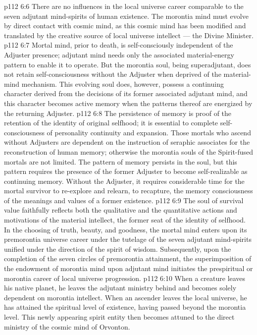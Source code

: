 \vs p112 6:6 There are no influences in the local universe career comparable to the seven adjutant mind\hyp{}spirits of human existence. The morontia mind must evolve by direct contact with cosmic mind, as this cosmic mind has been modified and translated by the creative source of local universe intellect --- the Divine Minister.
\vs p112 6:7 \pc Mortal mind, prior to death, is self\hyp{}consciously independent of the Adjuster presence; adjutant mind needs only the associated material\hyp{}energy pattern to enable it to operate. But the morontia soul, being superadjutant, does not retain self\hyp{}consciousness without the Adjuster when deprived of the material\hyp{}mind mechanism. This evolving soul does, however, possess a continuing character derived from the decisions of its former associated adjutant mind, and this character becomes active memory when the patterns thereof are energized by the returning Adjuster.
\vs p112 6:8 The persistence of memory is proof of the retention of the identity of original selfhood; it is essential to complete self\hyp{}consciousness of personality continuity and expansion. Those mortals who ascend without Adjusters are dependent on the instruction of seraphic associates for the reconstruction of human memory; otherwise the morontia souls of the Spirit\hyp{}fused mortals are not limited. The pattern of memory persists in the soul, but this pattern requires the presence of the former Adjuster to become  self\hyp{}realizable as continuing memory. Without the Adjuster, it requires considerable time for the mortal survivor to re\hyp{}explore and relearn, to recapture, the memory consciousness of the meanings and values of a former existence.
\vs p112 6:9 The soul of survival value faithfully reflects both the qualitative and the quantitative actions and motivations of the material intellect, the former seat of the identity of selfhood. In the choosing of truth, beauty, and goodness, the mortal mind enters upon its premorontia universe career under the tutelage of the seven adjutant mind\hyp{}spirits unified under the direction of the spirit of wisdom. Subsequently, upon the completion of the seven circles of premorontia attainment, the superimposition of the endowment of morontia mind upon adjutant mind initiates the prespiritual or morontia career of local universe progression.
\vs p112 6:10 \pc When a creature leaves his native planet, he leaves the adjutant ministry behind and becomes solely dependent on morontia intellect. When an ascender leaves the local universe, he has attained the spiritual level of existence, having passed beyond the morontia level. This newly appearing spirit entity then becomes attuned to the direct ministry of the cosmic mind of Orvonton.
